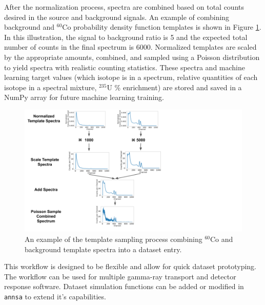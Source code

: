 After the normalization process, spectra are combined based on total counts desired in the source and background signals. An example of combining background and $^{60}$Co probability density function templates is shown in Figure \ref{fig:template_sampling_diagram}. In this illustration, the signal to background ratio is 5 and the expected total number of counts in the final spectrum is 6000. Normalized templates are scaled by the appropriate amounts, combined, and sampled using a Poisson distribution to yield spectra with realistic counting statistics. These spectra and machine learning target values (which isotope is in a spectrum, relative quantities of each isotope in a spectral mixture, $^{235}$U \% enrichment) are stored and saved in a NumPy array for future machine learning training.

\begin{figure}[H]
	\centering
	\includegraphics[trim=0 0 350 0,clip,width=1.0\linewidth]{images/template_sampling_diagram.png}
	\caption{An example of the template sampling process combining $^{60}$Co and background template spectra into a dataset entry.}
	\label{fig:template_sampling_diagram}
\end{figure}

This workflow is designed to be flexible and allow for quick dataset prototyping. The workflow can be used for multiple gamma-ray transport and detector response software. Dataset simulation functions can be added or modified in \verb|annsa| to extend it's capabilities.




